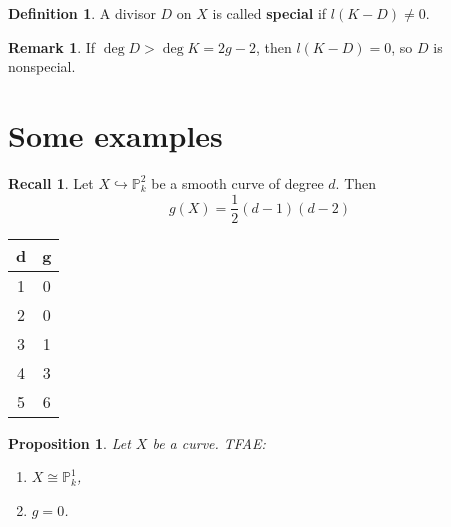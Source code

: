 \documentclass[12pt]{article}
\newtheorem*{proposition}{Proposition}
\theoremstyle{definition}
\newtheorem*{definition}{Definition}
\newtheorem*{remark}{Remark}
\newtheorem*{recall}{Recall}
\theoremstyle{remark}
\newtheorem*{comment}{Comment}
\begin{document}
\begin{definition}
A divisor $D$ on $X$ is called \textbf{special} if $l(K-D)\neq0$.
\end{definition}

\begin{remark}
If $\deg D>\deg K=2g-2$, then $l(K-D)=0$, so $D$ is nonspecial.
\end{remark}

\section{Some examples}
\begin{recall}
Let $X\hookrightarrow\mathbb{P}_k^2$ be a smooth curve of degree $d$. Then
\begin{equation}\tag{genus formula}
g(X)=\frac{1}{2}(d-1)(d-2)
\end{equation}
\end{recall}

\begin{table}
\centering
\begin{tabular}{c|c}
d&g\\\hline
1&0\\
2&0\\
3&1\\
4&3\\
5&6
\end{tabular}
\end{table}

\begin{comment}
There exist curves of arbitrary genus, but -- as seen in the table -- not necessarily in the projective plane. Every curve can be embedded in the three-dimensional projective space, but the embedding does not have good enough properties.
\end{comment}

\begin{proposition}
Let $X$ be a curve. TFAE:
\begin{enumerate}[label=\arabic*)]
\item\label{genus_line} $X\cong\mathbb{P}_k^1$,
\item\label{g=0} $g=0$.
\end{enumerate}
\end{proposition}
\end{document}
